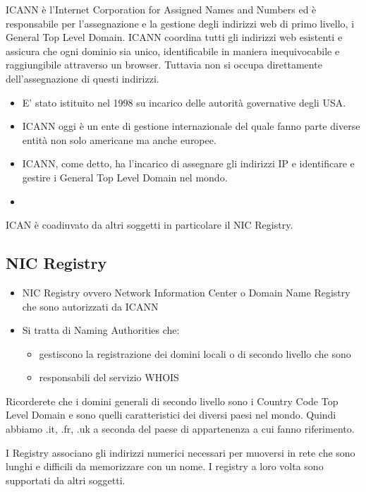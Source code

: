 ICANN è l'Internet Corporation for Assigned Names and Numbers ed è responsabile per l'assegnazione e la gestione degli indirizzi web di primo livello, i General Top Level Domain. ICANN coordina tutti gli indirizzi web esistenti e assicura che ogni dominio sia unico, identificabile in maniera inequivocabile e raggiungibile attraverso un browser. Tuttavia non si occupa direttamente dell'assegnazione di questi indirizzi.

\begin{itemize}
    \item E' stato istituito nel 1998 su incarico delle autorità governative degli USA.
    \item ICANN oggi è un ente di gestione internazionale del quale fanno parte diverse entità non solo americane ma anche europee.
    \item ICANN, come detto, ha l'incarico di assegnare gli indirizzi IP e identificare e gestire i General Top Level Domain nel mondo.
    \item
\end{itemize}

ICAN è coadiuvato da altri soggetti in particolare il NIC Registry.

\subsection{NIC Registry}

\begin{itemize}
    \item NIC Registry ovvero Network Information Center o Domain Name Registry che sono autorizzati da ICANN
    \item Si tratta di Naming Authorities che:
          \begin{itemize}
              \item gestiscono la registrazione dei domini locali o di secondo livello che sono
              \item responsabili del servizio WHOIS
          \end{itemize}
\end{itemize}

Ricorderete che i domini generali di secondo livello sono i Country Code Top Level Domain e sono quelli caratteristici dei diversi paesi nel mondo. Quindi abbiamo .it, .fr, .uk a seconda del paese di appartenenza a cui fanno riferimento. 

I Registry associano gli indirizzi numerici necessari per muoversi in rete che sono lunghi e difficili da memorizzare con un nome. I registry a loro volta sono supportati da altri soggetti.

